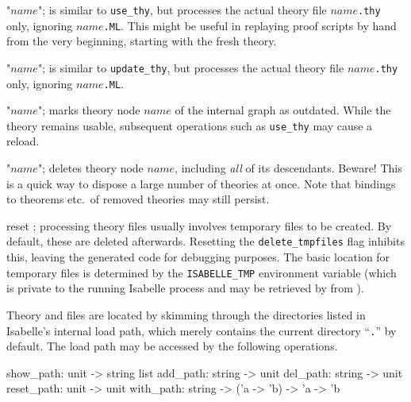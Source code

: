 \begin{ttdescription}
\item[\ttindexbold{use_thy_only} "$name$";] is similar to \texttt{use_thy},
  but processes the actual theory file $name$\texttt{.thy} only, ignoring
  $name$\texttt{.ML}.  This might be useful in replaying proof scripts by hand
  from the very beginning, starting with the fresh theory.
  
\item[\ttindexbold{update_thy_only} "$name$";] is similar to
  \texttt{update_thy}, but processes the actual theory file
  $name$\texttt{.thy} only, ignoring $name$\texttt{.ML}.

\item[\ttindexbold{touch_thy} "$name$";] marks theory node $name$ of the
  internal graph as outdated.  While the theory remains usable, subsequent
  operations such as \texttt{use_thy} may cause a reload.
  
\item[\ttindexbold{remove_thy} "$name$";] deletes theory node $name$,
  including \emph{all} of its descendants.  Beware!  This is a quick way to
  dispose a large number of theories at once.  Note that {\ML} bindings to
  theorems etc.\ of removed theories may still persist.
  
\item[reset \ttindexbold{delete_tmpfiles};] processing theory files usually
  involves temporary {\ML} files to be created.  By default, these are deleted
  afterwards.  Resetting the \texttt{delete_tmpfiles} flag inhibits this,
  leaving the generated code for debugging purposes.  The basic location for
  temporary files is determined by the \texttt{ISABELLE_TMP} environment
  variable (which is private to the running Isabelle process and may be
  retrieved by  from {\ML}).
\end{ttdescription}

\medskip Theory and {\ML} files are located by skimming through the
directories listed in Isabelle's internal load path, which merely contains the
current directory ``\texttt{.}'' by default.  The load path may be accessed by
the following operations.

\begin{ttbox}
show_path: unit -> string list
add_path: string -> unit
del_path: string -> unit
reset_path: unit -> unit
with_path: string -> ('a -> 'b) -> 'a -> 'b
\end{ttbox}

